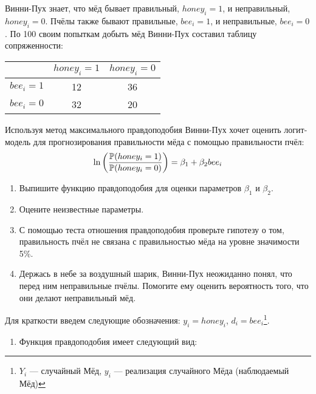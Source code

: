 \begin{problem}
Винни-Пух знает, что мёд бывает правильный, $honey_i=1$, и неправильный, $honey_i=0$. Пчёлы также бывают правильные, $bee_i=1$, и неправильные, $bee_i=0$. По 100 своим попыткам добыть мёд Винни-Пух составил таблицу сопряженности:

\begin{tabular}{c|cc}
\toprule
 & $honey_i=1$ & $honey_i=0$ \\
\midrule
$bee_i=1$ & 12 & 36 \\
$bee_i=0$ & 32 & 20 \\
\bottomrule
\end{tabular}

Используя метод максимального правдоподобия Винни-Пух хочет оценить логит-модель для прогнозирования правильности мёда с помощью правильности пчёл:
\[
\ln \left(\frac{\P(honey_i=1)}{\P(honey_i=0)} \right)=\beta_1 + \beta_2 bee_i
\]
\begin{enumerate}
\item Выпишите функцию правдоподобия для оценки параметров $\beta_1$ и $\beta_2$.
\item Оцените неизвестные параметры.
\item С помощью теста отношения правдоподобия проверьте гипотезу о том, правильность пчёл не связана с правильностью мёда на уровне значимости 5\%.
\item Держась в небе за воздушный шарик, Винни-Пух неожиданно понял, что перед ним неправильные пчёлы. Помогите ему оценить вероятность того, что они делают неправильный мёд.
\end{enumerate}


\begin{sol}
Для краткости введем следующие обозначения: $y_i = honey_i$, $d_i = bee_i$\footnote{$Y_i$ — случайный Мёд, $y_i$ — реализация случайного Мёда (наблюдаемый Мёд)}.

\begin{enumerate}
\item Функция правдоподобия имеет следующий вид:


\end{enumerate}
\end{sol}
\end{problem}
